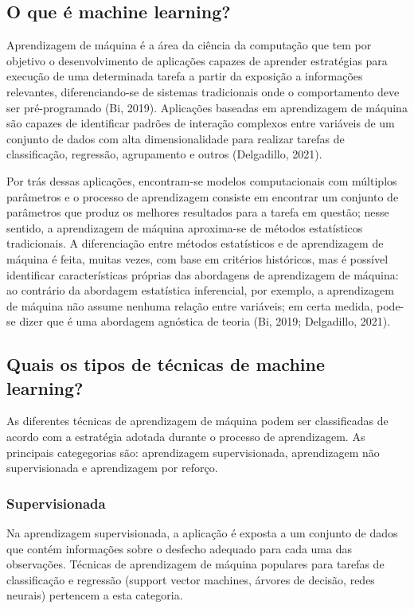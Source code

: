 \subsection{O que é machine learning?}

Aprendizagem de máquina é a área da ciência da computação que tem por objetivo o desenvolvimento
de aplicações capazes de aprender estratégias para execução de uma determinada tarefa a partir da
exposição a informações relevantes, diferenciando-se de sistemas tradicionais onde o comportamento
deve ser pré-programado (Bi, 2019). Aplicações baseadas em aprendizagem de máquina são capazes de
identificar padrões de interação complexos entre variáveis de um conjunto de dados com alta dimensionalidade
para realizar tarefas de classificação, regressão, agrupamento e outros (Delgadillo, 2021).

Por trás dessas aplicações, encontram-se modelos computacionais com múltiplos parâmetros e o processo de
aprendizagem consiste em encontrar um conjunto de parâmetros que produz os melhores resultados para a tarefa
em questão; nesse sentido, a aprendizagem de máquina aproxima-se de métodos estatísticos tradicionais. A diferenciação
entre métodos estatísticos e de aprendizagem de máquina é feita, muitas vezes, com base em critérios históricos,
mas é possível identificar características próprias das abordagens de aprendizagem de máquina: ao contrário da abordagem
estatística inferencial, por exemplo, a aprendizagem de máquina não assume nenhuma relação entre variáveis; em certa medida,
pode-se dizer que é uma abordagem agnóstica de teoria (Bi, 2019; Delgadillo, 2021).

\subsection{Quais os tipos de técnicas de machine learning?}
As diferentes técnicas de aprendizagem de máquina podem ser classificadas de acordo com a estratégia adotada
durante o processo de aprendizagem. As principais categegorias são: aprendizagem supervisionada, aprendizagem não
supervisionada e aprendizagem por reforço.

\subsubsection{Supervisionada}
Na aprendizagem supervisionada, a aplicação é exposta a um conjunto de dados que contém informações sobre o desfecho
adequado para cada uma das observações. Técnicas de aprendizagem de máquina populares para tarefas de classificação e 
regressão (support vector machines, árvores de decisão, redes neurais) pertencem a esta categoria.


